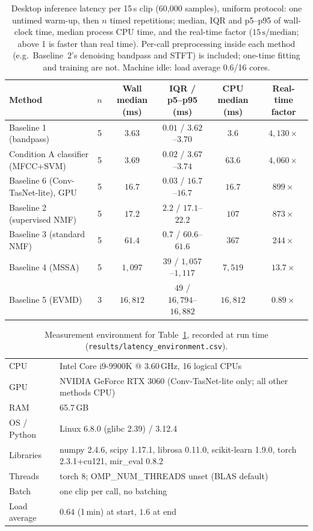 \documentclass[11pt]{article}
\begin{document}
\begin{table}[H]
\centering
\caption{Desktop inference latency per 15\,s clip (60{,}000 samples), uniform protocol: one untimed warm-up, then $n$ timed repetitions; median, IQR and p5--p95 of wall-clock time, median process CPU time, and the real-time factor ($15\,\text{s}/\text{median}$; above 1 is faster than real time). Per-call preprocessing inside each method (e.g.\ Baseline~2's denoising bandpass and STFT) is included; one-time fitting and training are not. Machine idle: load average $0.6$/16 cores.}
\label{tab:latency}
\small
\begin{tabular}{@{}lccccc@{}}
\toprule
Method & $n$ & Wall median (ms) & IQR / p5--p95 (ms) & CPU median (ms) & Real-time factor \\
\midrule
Baseline 1 (bandpass)            & 5 & $3.63$    & $0.01$ / $3.62$--$3.70$     & $3.6$    & $4{,}130\times$ \\
Condition A classifier (MFCC+SVM) & 5 & $3.69$   & $0.02$ / $3.67$--$3.74$     & $63.6$   & $4{,}060\times$ \\
Baseline 6 (Conv-TasNet-lite), GPU & 5 & $16.7$  & $0.03$ / $16.7$--$16.7$     & $16.7$   & $899\times$ \\
Baseline 2 (supervised NMF)      & 5 & $17.2$    & $2.2$ / $17.1$--$22.2$      & $107$    & $873\times$ \\
Baseline 3 (standard NMF)        & 5 & $61.4$    & $0.7$ / $60.6$--$61.6$      & $367$    & $244\times$ \\
Baseline 4 (MSSA)                & 5 & $1{,}097$ & $39$ / $1{,}057$--$1{,}117$ & $7{,}519$ & $13.7\times$ \\
Baseline 5 (EVMD)                & 3 & $16{,}812$ & $49$ / $16{,}794$--$16{,}882$ & $16{,}812$ & $0.89\times$ \\
\bottomrule
\end{tabular}
\end{table}

\begin{table}[H]
\centering
\caption{Measurement environment for Table~\ref{tab:latency}, recorded at run time (\texttt{results/latency\_environment.csv}).}
\label{tab:latencyenv}
\small
\begin{tabular}{@{}ll@{}}
\toprule
CPU & Intel Core i9-9900K @ 3.60\,GHz, 16 logical CPUs \\
GPU & NVIDIA GeForce RTX 3060 (Conv-TasNet-lite only; all other methods CPU) \\
RAM & 65.7\,GB \\
OS / Python & Linux 6.8.0 (glibc 2.39) / 3.12.4 \\
Libraries & numpy 2.4.6, scipy 1.17.1, librosa 0.11.0, scikit-learn 1.9.0, torch 2.3.1+cu121, mir\_eval 0.8.2 \\
Threads & torch 8; OMP\_NUM\_THREADS unset (BLAS default) \\
Batch & one clip per call, no batching \\
Load average & $0.64$ (1\,min) at start, $1.6$ at end \\
\bottomrule
\end{tabular}
\end{table}
\end{document}

